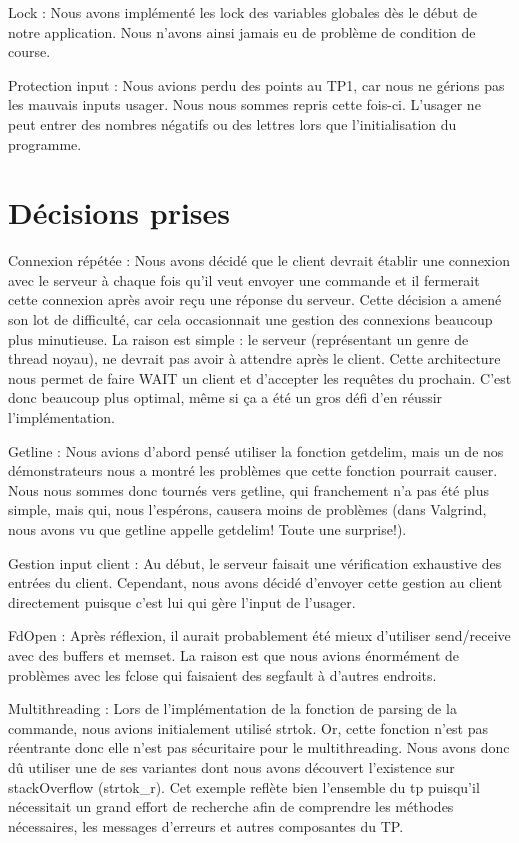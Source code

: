 \documentclass[11pt]{article}
\begin{document}
Lock : Nous avons implémenté les lock des variables globales dès le début de notre application. Nous n’avons ainsi jamais eu de problème de condition de course.

Protection input : Nous avions perdu des points au TP1, car nous ne gérions pas les mauvais inputs usager. Nous nous sommes repris cette fois-ci. L’usager ne peut entrer des nombres négatifs ou des lettres lors que l’initialisation du programme. 
\section{Décisions prises}
Connexion répétée : Nous avons décidé que le client devrait établir une connexion avec le serveur à chaque fois qu'il veut envoyer une commande et il fermerait cette connexion après avoir reçu une réponse du serveur. Cette décision a amené son lot de difficulté, car cela occasionnait une gestion des connexions beaucoup plus minutieuse. La raison est simple : le serveur (représentant un genre de thread noyau), ne devrait pas avoir à attendre après le client. Cette architecture nous permet de faire WAIT un client et d’accepter les requêtes du prochain. C’est donc beaucoup plus optimal, même si ça a été un gros défi d’en réussir l’implémentation. 

Getline : Nous avions d’abord pensé utiliser la fonction getdelim, mais un de nos démonstrateurs nous a  montré les problèmes que cette fonction pourrait causer. Nous nous sommes donc tournés vers getline, qui franchement n’a pas été plus simple, mais qui, nous l’espérons, causera moins de problèmes (dans Valgrind, nous avons vu que getline appelle getdelim! Toute une surprise!).

Gestion input client : Au début, le serveur faisait une vérification exhaustive des entrées du client. Cependant, nous avons décidé d’envoyer cette gestion au client directement puisque c’est lui qui gère l’input de l’usager.

FdOpen : Après réflexion, il aurait probablement été mieux d’utiliser send/receive avec des buffers et memset. La raison est que nous avions énormément de problèmes avec les fclose qui faisaient des segfault à d’autres endroits.

Multithreading : Lors de l’implémentation de la fonction de parsing de la commande, nous avions initialement utilisé strtok. Or, cette fonction n'est pas réentrante donc elle n'est pas sécuritaire pour le multithreading. Nous avons donc dû utiliser une de ses variantes dont nous avons découvert l'existence sur stackOverflow (strtok\_r). Cet exemple reflète bien l'ensemble du tp puisqu'il nécessitait un grand effort de recherche afin de comprendre les méthodes nécessaires, les messages d'erreurs et autres composantes du TP.
\end{document}

